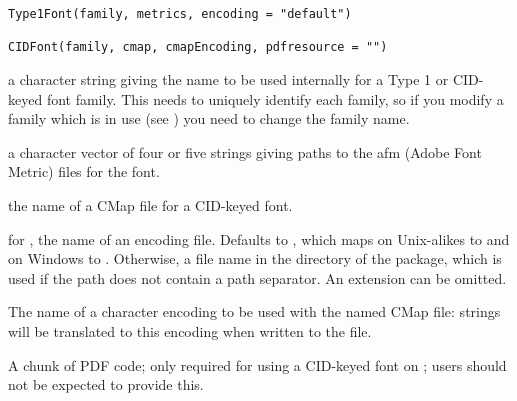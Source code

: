 %
\begin{Usage}
\begin{verbatim}
Type1Font(family, metrics, encoding = "default")

CIDFont(family, cmap, cmapEncoding, pdfresource = "")
\end{verbatim}
\end{Usage}
%
\begin{Arguments}
\begin{ldescription}
\item[\code{family}] a character string giving the name to be used internally
for a Type 1 or CID-keyed font family.  This needs to uniquely
identify each family, so if you modify a family which is in use
(see ) you need to change the family name.
\item[\code{metrics}] a character vector of four or five strings giving paths
to the afm (Adobe Font Metric) files for the font.
\item[\code{cmap}] the name of a CMap file for a CID-keyed font.
\item[\code{encoding}] for , the name of an encoding file.
Defaults to , which maps on Unix-alikes to
 and on Windows to .
Otherwise, a file name in the  directory of the
 package, which is used if the path does not contain a
path separator.  An extension  can be omitted.
\item[\code{cmapEncoding}] 
The name of a character encoding to be used with the named CMap
file: strings will be translated to this encoding when written to
the file.
\item[\code{pdfresource}] A chunk of PDF code;  only required for using
a CID-keyed font on ; users should not be expected to
provide this.
\end{ldescription}
\end{Arguments}
%
